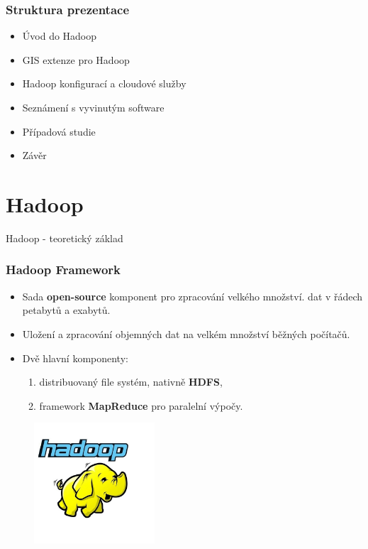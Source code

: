 \documentclass[unicode,bookmarksnumbered]{beamer}
\begin{document}
	\begin{frame}
		\frametitle{Struktura prezentace}
		\begin{itemize}
			\item Úvod do Hadoop 
			\item GIS extenze pro Hadoop
			\item Hadoop konfigurací a cloudové služby
			\item Seznámení s vyvinutým software
			\item Případová studie
			\item Závěr
		\end{itemize}
	\end{frame}
%


	\section{Hadoop}
	\begin{frame}[c]
		\begin{center}	
		\Huge Hadoop - teoretický základ
		\end{center}
	\end{frame}
 
	\begin{frame}
		\frametitle{Hadoop Framework}

			\begin{itemize}
				\item Sada \textbf{open-source} komponent pro zpracování velkého množství.
dat v řádech petabytů a exabytů.  
				\item Uložení a zpracování objemných dat na velkém množství běžných počítačů. 
				\item Dvě hlavní komponenty:
				\begin{enumerate}
					\item distribuovaný file systém, nativně \textbf{HDFS},
					\item framework \textbf{MapReduce} pro paralelní výpočy.
				\end{enumerate}
			\end{itemize}
			\begin{figure}
				\centering
				\includegraphics[width=0.4\textwidth]{./img/hadoop/hadoop_logo.jpg}
			\end{figure}
	\end{frame}
%
\end{document}
